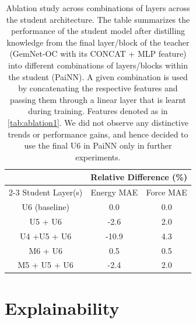 \documentclass{article}
\begin{document}
\begin{table}[h]
\centering
\caption{Ablation study across combinations of layers across the student architecture. The table summarizes the performance of the student model after distilling knowledge from the final layer/block of the teacher (GemNet-OC with its CONCAT + MLP feature) into different combinations of layers/blocks within the student (PaiNN). A given combination is used by concatenating the respective features and passing them through a linear layer that is learnt during training. Features denoted as in \cref{tab:ablation1}. We did not observe any distinctive trends or performance gains, and hence decided to use the final U6 in PaiNN only in further experiments.}
\label{tab:ablation3}
\begin{tabular}{ccc}
\multicolumn{1}{l}{}               & \multicolumn{2}{c}{Relative Difference (\%)} \\ \cline{2-3} 
Student Layer(s)                           & Energy MAE            & Force MAE            \\ \hline
\multicolumn{1}{c|}{U6 (baseline)} & 0.0                   & 0.0                  \\
\multicolumn{1}{c|}{U5 + U6}       & -2.6                  & 2.0                  \\
\multicolumn{1}{c|}{U4 +U5 + U6}   & -10.9                 & 4.3                  \\
\multicolumn{1}{c|}{M6 + U6}       & 0.5                   & 0.5                  \\
\multicolumn{1}{c|}{M5 + U5 + U6}  & -2.4                  & 2.0                 
\end{tabular}
\end{table}



\section{Explainability}
\label{ap:cka}

\end{document}
